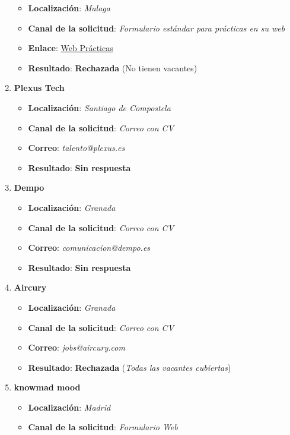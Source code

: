 \begin{enumerate}
\begin{itemize}
		\item \textbf{Localización}: \textit{Malaga}
		\item \textbf{Canal de la solicitud}: \textit{Formulario estándar para prácticas en su web}
		\item \textbf{Enlace}: \href{https://www.accenture.com/es-es/careers/life-at-accenture/internships-careers}{Web Prácticas}
		\item \textbf{Resultado}: {\color{red} \textbf{Rechazada}} (No tienen vacantes)
	\end{itemize}
		\item \textbf{Plexus Tech}
	\begin{itemize}
		\item \textbf{Localización}: \textit{Santiago de Compostela}
		\item \textbf{Canal de la solicitud}: \textit{Correo con CV}
		\item \textbf{Correo}: \textit{talento@plexus.es}
		\item \textbf{Resultado}: {\color{orange} \textbf{Sin respuesta}}
	\end{itemize}
	\item \textbf{Dempo}
	\begin{itemize}
		\item \textbf{Localización}: \textit{Granada}
		\item \textbf{Canal de la solicitud}: \textit{Correo con CV}
		\item \textbf{Correo}: \textit{comunicacion@dempo.es}
		\item \textbf{Resultado}: {\color{orange} \textbf{Sin respuesta}}
	\end{itemize}
		\item \textbf{Aircury}
	\begin{itemize}
		\item \textbf{Localización}: \textit{Granada}
		\item \textbf{Canal de la solicitud}: \textit{Correo con CV}
		\item \textbf{Correo}: \textit{jobs@aircury.com}
		\item \textbf{Resultado}: {\color{red}\textbf{Rechazada}} (\textit{Todas las vacantes cubiertas})
	\end{itemize}
	\item \textbf{knowmad mood}
	\begin{itemize}
		\item \textbf{Localización}: \textit{Madrid}
		\item \textbf{Canal de la solicitud}: \textit{Formulario Web}

\end{itemize}
\end{enumerate}
